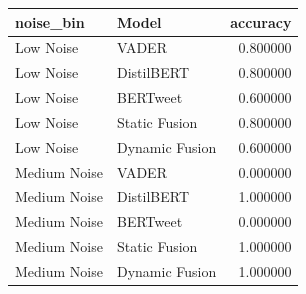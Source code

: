 \begin{tabular}{llr}
\toprule
noise_bin & Model & accuracy \\
\midrule
Low Noise & VADER & 0.800000 \\
Low Noise & DistilBERT & 0.800000 \\
Low Noise & BERTweet & 0.600000 \\
Low Noise & Static Fusion & 0.800000 \\
Low Noise & Dynamic Fusion & 0.600000 \\
Medium Noise & VADER & 0.000000 \\
Medium Noise & DistilBERT & 1.000000 \\
Medium Noise & BERTweet & 0.000000 \\
Medium Noise & Static Fusion & 1.000000 \\
Medium Noise & Dynamic Fusion & 1.000000 \\
\bottomrule
\end{tabular}
